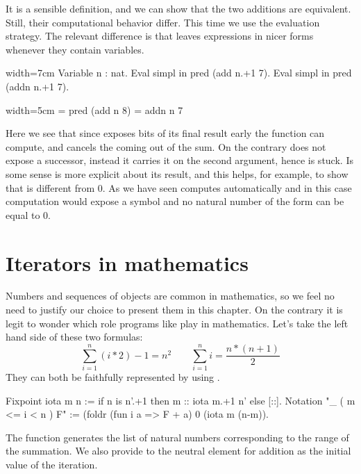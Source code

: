 It is a sensible definition, and we can show that the two additions
are equivalent.  Still, their computational behavior differ.
This time we use the  evaluation strategy.  The relevant difference
is that  leaves expressions in nicer forms whenever they contain
variables.

\begin{coq}{}{width=7cm}
Variable n : nat.
Eval simpl in pred (add n.+1 7).
Eval simpl in pred (addn n.+1 7).
\end{coq}
\begin{coqout}{}{width=5cm}
= pred (add n 8)
= addn n 7
\end{coqout}

Here we see that since  exposes bits of its
final result early the  function can compute, and cancels
the  coming out of the sum.  On the contrary
 does not expose a successor, instead it carries it on the second
argument, hence  is stuck.  Is some sense  is more
explicit about its result, and this helps, for example, to show that
 is different from 0. As we have seen \Coq{} computes
automatically and in this case computation would expose a  symbol
and no natural number of the form  can be equal to 0.

\section{Iterators in mathematics}

Numbers and sequences of objects are common in mathematics, so we feel
no need to justify our choice to present them in this chapter.
On the contrary it is legit to wonder which role programs like 
play in mathematics.
Let's take the left hand side of these two formulas:
$$
\sum_{i=1}^n (i * 2) - 1 = n ^ 2 \qquad
\sum_{i=1}^n i = \frac{n * (n + 1)}{2}
$$
They can both be faithfully represented by using .

\begin{coq}{}{}
Fixpoint iota m n := if n is n'.+1 then m :: iota m.+1 n' else [::].
Notation "\sum_ ( m <= i < n ) F" :=
  (foldr (fun i a => F + a) 0 (iota m (n-m)).
\end{coq}

The  function generates the list of natural numbers
corresponding to the range of the summation.  We also provide
to  the neutral element for addition as the initial value
of the iteration.

